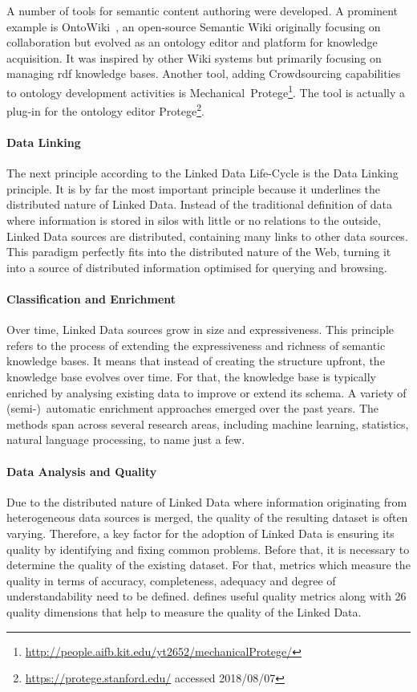 A number of tools for semantic content authoring were developed. A prominent example is OntoWiki~\cite{auer2006}, an open-source Semantic Wiki originally focusing on collaboration but evolved as an ontology editor and platform for knowledge acquisition. It was inspired by other Wiki systems but primarily focusing on managing \gls{rdf} knowledge bases.  Another tool, adding Crowdsourcing capabilities to ontology development activities is Mechanical~Protege\footnote{\url{http://people.aifb.kit.edu/yt2652/mechanicalProtege/}}. The tool is actually a plug-in for the ontology editor Protege\footnote{\url{https://protege.stanford.edu/} accessed 2018/08/07}. 

\paragraph{Data Linking}
The next principle according to the Linked Data Life-Cycle is the Data Linking principle. It is by far the most important principle because it 
underlines the distributed nature of Linked Data. Instead of the traditional definition of data where information is stored in silos with little or no 
relations to the outside, Linked Data sources are distributed, containing many links to other data sources. This paradigm perfectly fits into the distributed nature of the Web, turning it into a source of distributed information optimised for querying and browsing. 

\paragraph{Classification and Enrichment}
Over time, Linked Data sources grow in size and expressiveness. This principle refers to the process of extending the expressiveness and richness 
of semantic knowledge bases. It means that instead of creating the structure upfront, the knowledge base evolves over time. For that, the knowledge 
base is typically enriched by analysing existing data to improve or extend its schema. A variety of (semi-)~automatic enrichment approaches emerged over the past years. The methods span across several research areas, including machine learning, statistics, natural language processing, to name just a few. 

\paragraph{Data Analysis and Quality}
Due to the distributed nature of Linked Data where information originating from heterogeneous data sources is merged, the quality of the resulting
dataset is often varying. Therefore, a key factor for the adoption of Linked Data is ensuring its quality by identifying and fixing common problems. Before that, it is necessary to determine the quality of the existing dataset. For that, metrics which measure the quality in terms of accuracy, completeness, adequacy and degree of understandability need to be defined. \cite{zaveri2016} defines useful quality metrics along with 26 quality dimensions that help to measure the quality of the Linked Data.

